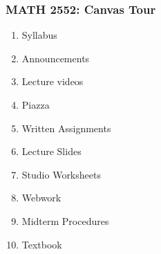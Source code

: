 





\begin{frame} \frametitle{MATH 2552: Canvas Tour}

\begin{enumerate}
    \item Syllabus
    \item Announcements
    \item Lecture videos
    \item Piazza
    \item Written Assignments
    \item Lecture Slides
    \item Studio Worksheets
    \item Webwork
    \item Midterm Procedures
    \item Textbook
\end{enumerate}


\end{frame}
